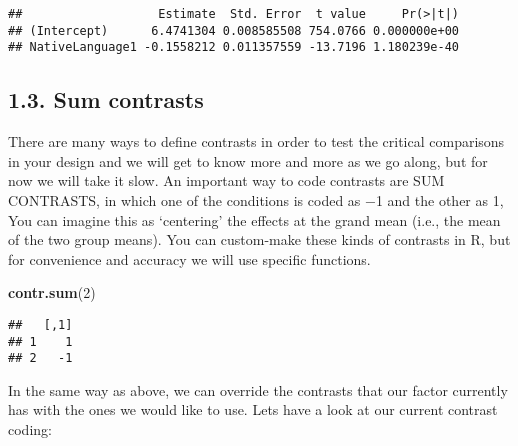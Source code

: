\documentclass[
]{article}
\newenvironment{Shaded}{\begin{snugshade}}{\end{snugshade}}
\newcommand{\DataTypeTok}[1]{\textcolor[rgb]{0.13,0.29,0.53}{#1}}
\newcommand{\DecValTok}[1]{\textcolor[rgb]{0.00,0.00,0.81}{#1}}
\newcommand{\KeywordTok}[1]{\textcolor[rgb]{0.13,0.29,0.53}{\textbf{#1}}}
\newcommand{\NormalTok}[1]{#1}
\newcommand{\OperatorTok}[1]{\textcolor[rgb]{0.81,0.36,0.00}{\textbf{#1}}}
\newcommand{\StringTok}[1]{\textcolor[rgb]{0.31,0.60,0.02}{#1}}
\begin{document}
\begin{Shaded}
\end{Shaded}

\begin{verbatim}
##                   Estimate  Std. Error  t value     Pr(>|t|)
## (Intercept)      6.4741304 0.008585508 754.0766 0.000000e+00
## NativeLanguage1 -0.1558212 0.011357559 -13.7196 1.180239e-40
\end{verbatim}

\hypertarget{sum-contrasts}{%
\subsection{1.3. Sum contrasts}\label{sum-contrasts}}

There are many ways to define contrasts in order to test the critical
comparisons in your design and we will get to know more and more as we
go along, but for now we will take it slow. An important way to code
contrasts are SUM CONTRASTS, in which one of the conditions is coded as
−1 and the other as 1, You can imagine this as `centering' the effects
at the grand mean (i.e., the mean of the two group means). You can
custom-make these kinds of contrasts in R, but for convenience and
accuracy we will use specific functions.

\begin{Shaded}
\begin{Highlighting}[]
\KeywordTok{contr.sum}\NormalTok{(}\DecValTok{2}\NormalTok{)}
\end{Highlighting}
\end{Shaded}

\begin{verbatim}
##   [,1]
## 1    1
## 2   -1
\end{verbatim}

In the same way as above, we can override the contrasts that our factor
currently has with the ones we would like to use. Lets have a look at
our current contrast coding:

\begin{Shaded}
\end{Shaded}
\end{document}
